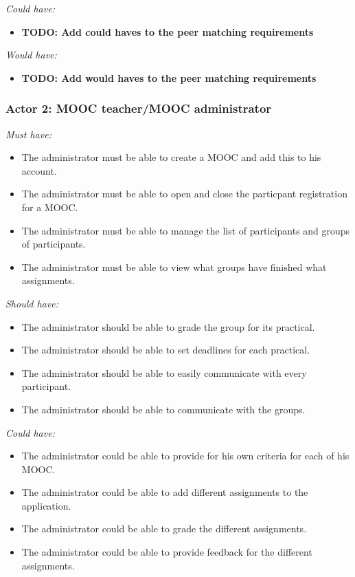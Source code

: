 \documentclass[]{article}
\newcommand{\TODO}[1]{{\color{red}\textbf{TODO: #1}}}
\newcommand{\reqr}[1]{{\noindent\emph{#1:}}}
\begin{document}
\reqr{Could have}
\begin{itemize}
\item \TODO{Add could haves to the peer matching requirements}
\end{itemize}

\reqr{Would have}
\begin{itemize}
\item \TODO{Add would haves to the peer matching requirements}
\end{itemize}


\subsubsection{Actor 2: MOOC teacher/MOOC administrator}

\reqr{Must have}
\begin{itemize}
\item The administrator must be able to create a MOOC and add this to his account.
\item The administrator must be able to open and close the particpant registration for a MOOC.
\item The administrator must be able to manage the list of participants and groups of participants.
\item The administrator must be able to view what groups have finished what assignments.
\end{itemize}

\reqr{Should have}
\begin{itemize}
\item The administrator should be able to grade the group for its practical.
\item The administrator should be able to set deadlines for each practical.
\item The administrator should be able to easily communicate with every participant.
\item The administrator should be able to communicate with the groups.
\end{itemize}

\reqr{Could have}
\begin{itemize}
\item The administrator could be able to provide for his own criteria for each of his MOOC.
\item The administrator could be able to add different assignments to the application.
\item The administrator could be able to grade the different assignments.
\item The administrator could be able to provide feedback for the different assignments.
\end{itemize}
\end{document}
